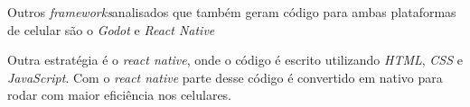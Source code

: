 Outros \textit{frameworks}analisados que também geram código para ambas plataformas de celular são o \textit{Godot} e \textit{React Native}

Outra estratégia é o \textit{react native}, onde o código é escrito utilizando \textit{HTML}, \textit{CSS} e \textit{JavaScript}. Com o \textit{react native} parte desse código é convertido em nativo para rodar com maior eficiência nos celulares.
